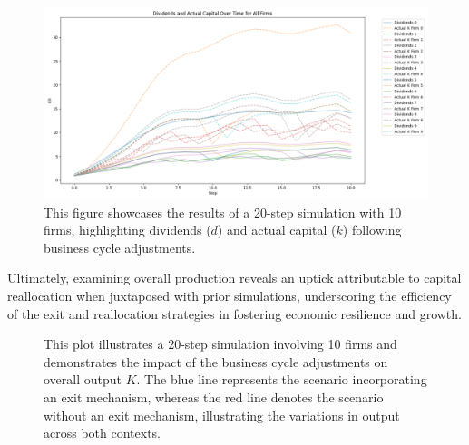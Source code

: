 \documentclass[12pt]{report}
\begin{document}
\begin{figure}[H]
    \centering
    \includegraphics[scale=0.4]{figure/div_cap_exit.png}
    \caption{This figure showcases the results of a 20-step simulation with 10 firms, highlighting dividends (\( d \))
    and actual 
    capital (\( k \)) following business cycle adjustments.}
    \label{fig:divExit}
\end{figure}

Ultimately, examining overall production reveals an uptick attributable to capital reallocation when juxtaposed with
prior simulations, underscoring the efficiency of the exit and reallocation strategies in fostering economic resilience
and growth.


\begin{figure}[H]
    \centering
    \caption{This plot illustrates a 20-step simulation involving 10 firms and demonstrates the impact of the business cycle
    adjustments on overall output \( K \). The blue line represents the scenario incorporating an exit mechanism, whereas
    the red line denotes the scenario without an exit mechanism, illustrating the variations in output across both
     contexts.}
    \label{fig:OutExit}
\end{figure}
\end{document}
